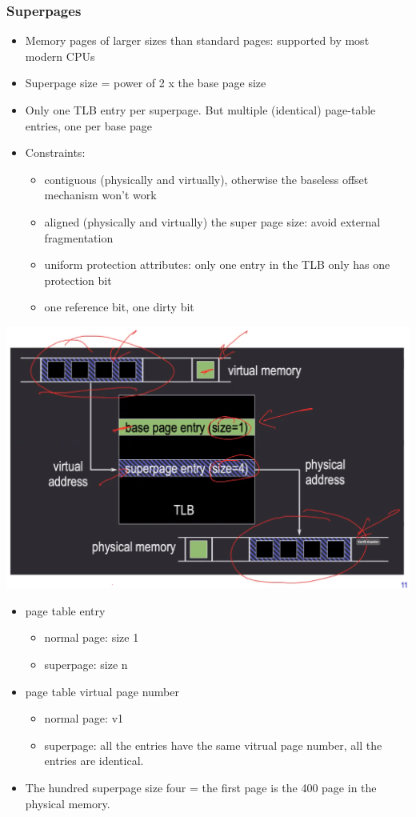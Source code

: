 \documentclass[12pt]{article}
\begin{document}
\subsubsection{Superpages}
\begin{itemize}
    \item Memory pages of larger sizes than standard pages: supported by most modern CPUs
    \item Superpage size = power of 2 x the base page size
    \item Only one TLB entry per superpage. But multiple (identical) page-table entries, one per base page
    \item Constraints: \begin{itemize}
        \item contiguous (physically and virtually), otherwise the baseless offset mechanism won't work
        \item aligned (physically and virtually) the super page size: avoid external fragmentation
        \item uniform protection attributes: only one entry in the TLB only has one protection bit
        \item one reference bit, one dirty bit
    \end{itemize}
\end{itemize}
\includegraphics[width=\textwidth]{SuperpageTLBExample.png}
\begin{itemize}
    \item page table entry \begin{itemize}
        \item normal page: size 1
        \item superpage: size n
    \end{itemize}
    \item page table virtual page number \begin{itemize}
        \item normal page: v1
        \item superpage: all the entries have the same vitrual page number, all the entries are identical.
    \end{itemize}
    \item The hundred superpage size four = the first page is the 400 page in the physical memory.
\end{itemize}
\end{document}
